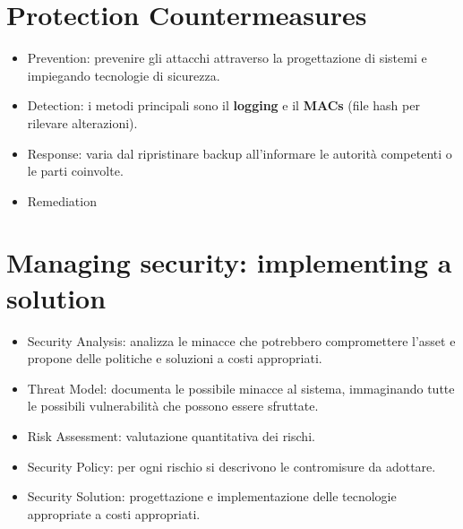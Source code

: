 \documentclass[12pt, a4paper]{report}
\begin{document}
\section{Protection Countermeasures}
\begin{itemize}
    \item Prevention: prevenire gli attacchi attraverso la progettazione di sistemi e impiegando tecnologie di sicurezza.
    \item Detection: i metodi principali sono il \textbf{logging} e il \textbf{MACs} (file hash per rilevare alterazioni).
    \item Response: varia dal ripristinare backup all'informare le autorità competenti o le parti coinvolte.
    \item Remediation
\end{itemize}
\section{Managing security: implementing a solution}
\begin{itemize}
    \item Security Analysis: analizza le minacce che potrebbero compromettere l'asset e propone delle politiche e soluzioni a costi appropriati.
    \item Threat Model: documenta le possibile minacce al sistema, immaginando tutte le possibili vulnerabilità che possono essere sfruttate.
    \item Risk Assessment: valutazione quantitativa dei rischi.
    \item Security Policy: per ogni rischio si descrivono le contromisure da adottare.
    \item Security Solution: progettazione e implementazione delle tecnologie appropriate a costi appropriati.
\end{itemize}
\end{document}

